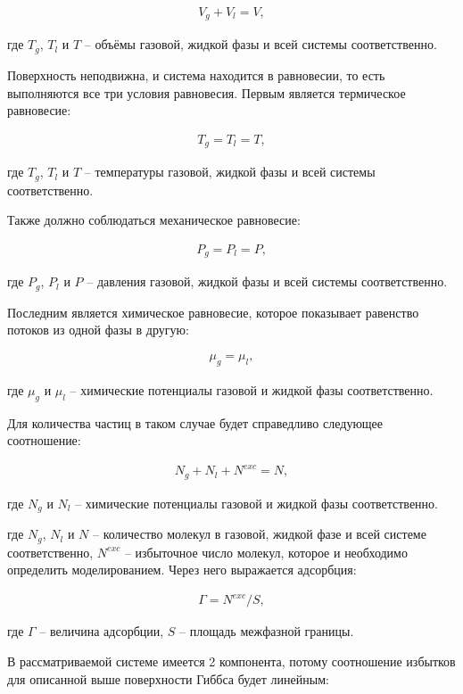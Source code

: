 \begin{align}
	V_g + V_l = V,
\end{align}

где $T_g$, $T_l$ и $T$ \--- объёмы газовой, жидкой фазы и всей системы соответственно.

Поверхность неподвижна, и система находится в равновесии, то есть выполняются все три условия равновесия. Первым является термическое равновесие:

\begin{align}
	T_g = T_l = T,
\end{align}

где $T_g$, $T_l$ и $T$ \--- температуры газовой, жидкой фазы и всей системы соответственно. 

Также должно соблюдаться механическое равновесие:

\begin{align}
	P_g = P_l = P,
\end{align}

где $P_g$, $P_l$ и $P$ \--- давления газовой, жидкой фазы и всей системы соответственно. 

Последним является химическое равновесие, которое показывает равенство потоков из одной фазы в другую:

\begin{align}
	\mu_g = \mu_l,
\end{align}

где $\mu_g$ и $\mu_l$ \--- химические потенциалы газовой и жидкой фазы соответственно.

Для количества частиц в таком случае будет справедливо следующее соотношение:

\begin{align}
	N_g + N_l + N^{exc} = N,
\end{align}

где $N_g$ и $N_l$ \--- химические потенциалы газовой и жидкой фазы соответственно.

где $N_g$, $N_l$ и $N$ \--- количество молекул в газовой, жидкой фазе и всей системе соответственно, $N^{exc}$  \--- избыточное число молекул, которое и необходимо определить моделированием. Через него выражается адсорбция:

\begin{align}
	\Gamma = N^{exc}/S,
\end{align}

где $\Gamma$ \--- величина адсорбции, $S$ \--- площадь межфазной границы. 

В рассматриваемой системе имеется 2 компонента, потому соотношение избытков для описанной выше поверхности Гиббса будет линейным:

